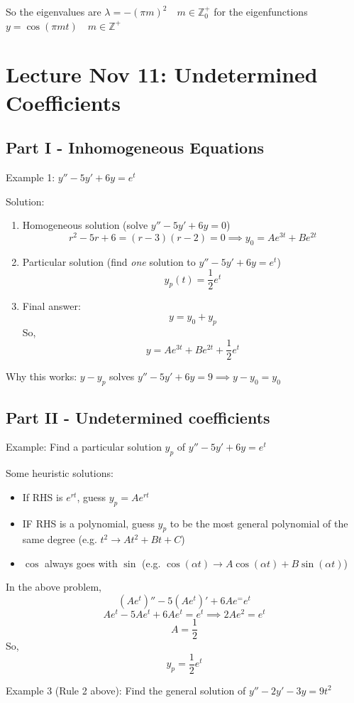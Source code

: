 \documentclass[12pt]{article}
\begin{document}
So the eigenvalues are $\lambda = -(\pi m)^2 \quad m \in \mathbb{Z}^+_0$ for the eigenfunctions $y = \cos (\pi m t) \quad m \in \mathbb{Z}^+$

\section{Lecture Nov 11: Undetermined Coefficients}
\subsection*{Part I - Inhomogeneous Equations}
Example 1: $y'' - 5y' + 6y = e^t$

Solution:
\begin{enumerate}
    \item Homogeneous solution (solve $y'' - 5y' + 6y = 0$)
    \[r^2 - 5r + 6 = (r - 3)(r - 2) = 0 \implies y_0 = Ae^{3t} + Be^{2t}\]
    \item Particular solution (find \emph{one} solution to $y'' - 5y' + 6y = e^t$)
    \[y_p(t) = \frac{1}{2}e^t\]
    \item Final answer:
    \[y = y_0 + y_p\]
    So, 
    \[y = Ae^{3t} + Be^{2t} + \frac{1}{2}e^t\]
\end{enumerate}

Why this works:
$y - y_p$ solves $y'' - 5y' + 6y =9 \implies y- y_0 = y_0$

\subsection*{Part II - Undetermined coefficients}
Example: Find a particular solution $y_p$ of $y'' - 5y' + 6y = e^t$

Some heuristic solutions:
\begin{itemize}
    \item If RHS is $e^{rt}$, guess $y_p = Ae^{rt}$
    \item IF RHS is a polynomial, guess $y_p$ to be the most general polynomial of the same degree 
    (e.g. $t^2 \longrightarrow At^2 + Bt + C$)
    \item $\cos$ always goes with $\sin$
    (e.g. $\cos(\alpha t) \longrightarrow A\cos(\alpha t) + B\sin(\alpha t)$)
\end{itemize}

In the above problem,
\[(Ae^t)'' - 5(Ae^t)' + 6Ae^= e^t\]
\[Ae^t - 5Ae^t + 6Ae^t = e^t \implies 2Ae^2 = e^t\]
\[A = \frac{1}{2}\]
So, 
\[y_p = \frac{1}{2}e^t\]

Example 3 (Rule 2 above):
Find the general solution of $y'' - 2y' - 3y = 9t^2$
\end{document}
